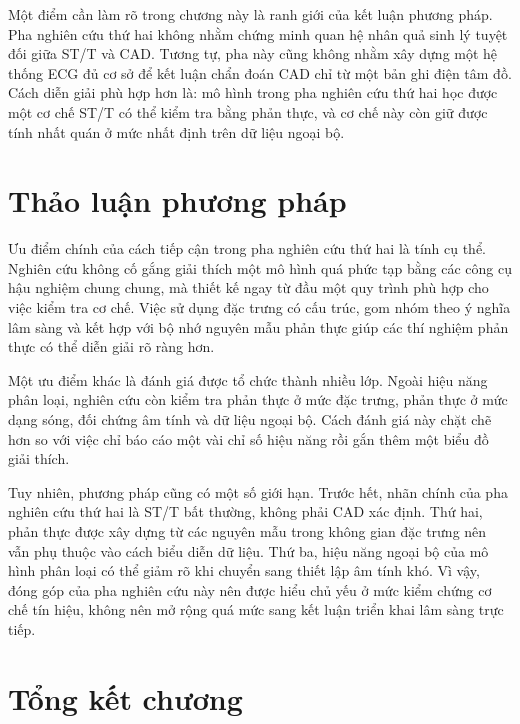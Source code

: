 \blocksep

Một điểm cần làm rõ trong chương này là ranh giới của kết luận phương pháp. Pha nghiên cứu thứ hai không nhằm chứng minh quan hệ nhân quả sinh lý tuyệt đối giữa ST/T và CAD. Tương tự, pha này cũng không nhằm xây dựng một hệ thống ECG đủ cơ sở để kết luận chẩn đoán CAD chỉ từ một bản ghi điện tâm đồ. Cách diễn giải phù hợp hơn là: mô hình trong pha nghiên cứu thứ hai học được một cơ chế ST/T có thể kiểm tra bằng phản thực, và cơ chế này còn giữ được tính nhất quán ở mức nhất định trên dữ liệu ngoại bộ.

\section{Thảo luận phương pháp}

\blocksep

Ưu điểm chính của cách tiếp cận trong pha nghiên cứu thứ hai là tính cụ thể. Nghiên cứu không cố gắng giải thích một mô hình quá phức tạp bằng các công cụ hậu nghiệm chung chung, mà thiết kế ngay từ đầu một quy trình phù hợp cho việc kiểm tra cơ chế. Việc sử dụng đặc trưng có cấu trúc, gom nhóm theo ý nghĩa lâm sàng và kết hợp với bộ nhớ nguyên mẫu phản thực giúp các thí nghiệm phản thực có thể diễn giải rõ ràng hơn.

\blocksep

Một ưu điểm khác là đánh giá được tổ chức thành nhiều lớp. Ngoài hiệu năng phân loại, nghiên cứu còn kiểm tra phản thực ở mức đặc trưng, phản thực ở mức dạng sóng, đối chứng âm tính và dữ liệu ngoại bộ. Cách đánh giá này chặt chẽ hơn so với việc chỉ báo cáo một vài chỉ số hiệu năng rồi gắn thêm một biểu đồ giải thích.

\blocksep

Tuy nhiên, phương pháp cũng có một số giới hạn. Trước hết, nhãn chính của pha nghiên cứu thứ hai là ST/T bất thường, không phải CAD xác định. Thứ hai, phản thực được xây dựng từ các nguyên mẫu trong không gian đặc trưng nên vẫn phụ thuộc vào cách biểu diễn dữ liệu. Thứ ba, hiệu năng ngoại bộ của mô hình phân loại có thể giảm rõ khi chuyển sang thiết lập âm tính khó. Vì vậy, đóng góp của pha nghiên cứu này nên được hiểu chủ yếu ở mức kiểm chứng cơ chế tín hiệu, không nên mở rộng quá mức sang kết luận triển khai lâm sàng trực tiếp.

\section{Tổng kết chương}

